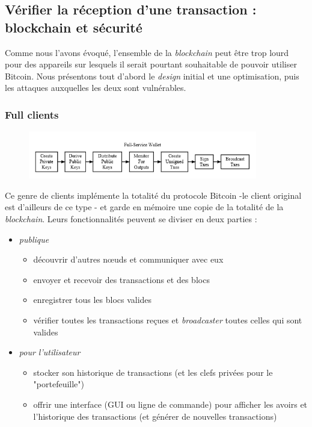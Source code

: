 \documentclass[11pt,a4paper]{article}
\begin{document}
\subsection{Vérifier la réception d'une transaction : blockchain et sécurité}
Comme nous l'avons évoqué, l'ensemble de la \textit{blockchain} peut être trop lourd pour des appareils sur lesquels il serait pourtant souhaitable de pouvoir utiliser Bitcoin. Nous présentons tout d'abord le \textit{design} initial et une optimisation, puis les attaques auxquelles les deux sont vulnérables.
\subsubsection{Full clients}
\begin{figure}[h]
	\centering
	\includegraphics[width=10cm]{en-wallets-full-service}
\end{figure}
Ce genre de clients implémente la totalité du protocole Bitcoin -le client original est d'ailleurs de ce type - et garde en mémoire une copie de la totalité de la \textit{blockchain}. Leurs fonctionnalités peuvent se diviser en deux parties :
\begin{itemize}
	\item \textit{publique}\begin{itemize}
		\item découvrir d'autres n\oe{}uds et communiquer avec eux
		\item envoyer et recevoir des transactions et des blocs
		\item enregistrer tous les blocs valides
		\item vérifier toutes les transactions reçues et \textit{broadcaster} toutes celles qui sont valides
	\end{itemize}
	\item \textit{pour l'utilisateur} \begin{itemize}
		\item stocker son historique de transactions (et les clefs privées pour le "portefeuille")
		\item offrir une interface (GUI ou ligne de commande) pour afficher les avoirs et l'historique des transactions (et générer de nouvelles transactions)\\
	\end{itemize}
\end{itemize}
\end{document}
